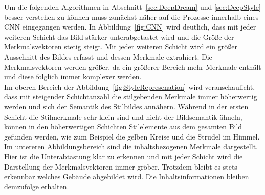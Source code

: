 \documentclass[times, 11pt,twocolumn]{article}
\begin{document}
\label{sec:Stilsynthese}
Um die folgenden Algorithmen in Abschnitt~\ref{sec:DeepDream} und \ref{sec:DeepStyle} besser verstehen zu können muss zunächst näher auf die Prozesse innerhalb eines CNN eingegangen werden. In Abbildung~\ref{fig:CNN} wird deutlich, dass mit jeder weiteren Schicht das Bild stärker unterabgetastet wird und die Größe der Merkmalsvektoren stetig steigt. Mit jeder weiteren Schicht wird ein größer Ausschnitt des Bildes erfasst und dessen Merkmale extrahiert. Die Merkmalsvektoren werden größer, da ein größerer Bereich mehr Merkmale enthält und diese folglich immer komplexer werden. \\
Im oberen Bereich der Abbildung~\ref{fig:StyleRepresenation} wird veranschaulicht, dass mit steigender Schichtanzahl die stilgebenden Merkmale immer höherwertig werden und sich der Semantik des Stilbildes annähern. Während in der ersten Schicht die Stilmerkmale sehr klein sind und nicht der Bildsemantik ähneln, können in den höherwertigen Schichten Stilelemente aus dem gesamten Bild gefunden werden, wie zum Beispiel die gelben Kreise und die Strudel im Himmel. Im untereren Abbildungsbereich sind die inhaltsbezogenen Merkmale dargestellt. Hier ist die Unterabtastung klar zu erkennen und mit jeder Schicht wird die Darstellung der Merkmalsvektoren immer gröber. Trotzdem bleibt es stets erkennbar welches Gebäude abgebildet wird. Die Inhaltsinformationen bleiben demzufolge erhalten.\\
\end{document}

